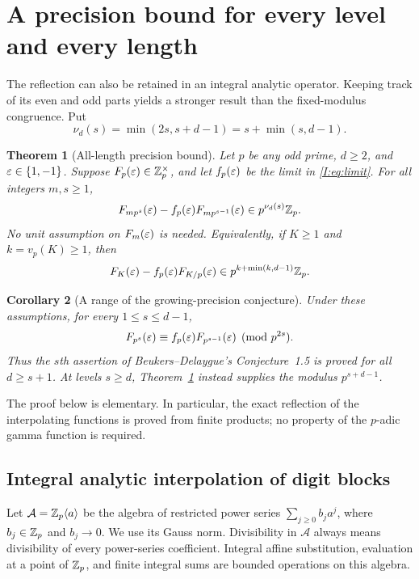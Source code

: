 \documentclass[11pt,letterpaper]{article}
\newtheorem{theorem}{Theorem}[section]
\newtheorem{corollary}[theorem]{Corollary}
\theoremstyle{definition}
\theoremstyle{remark}
\begin{document}
\section{A precision bound for every level and every length}
\label{I:sec:transfer}

The reflection can also be retained in an integral analytic operator.
Keeping track of its even and odd parts yields a stronger result than
the fixed-modulus congruence.
Put
\[
 \nu_d(s)=\min(2s,s+d-1)=s+\min(s,d-1).
\]

\begin{theorem}[All-length precision bound]\label{I:thm:alllength}
Let $p$ be any odd prime, $d\ge2$, and $\varepsilon\in\{1,-1\}$.
Suppose $F_p(\varepsilon)\in\mathbb Z_p^\times$, and let $f_p(\varepsilon)$ be the limit
in \eqref{I:eq:limit}.  For all integers $m,s\ge1$,
\begin{equation}\label{I:eq:alllength}
 F_{mp^s}(\varepsilon)-f_p(\varepsilon)F_{mp^{s-1}}(\varepsilon)
                  \in p^{\nu_d(s)}\mathbb Z_p.
\end{equation}
No unit assumption on $F_m(\varepsilon)$ is needed.
Equivalently, if $K\ge1$ and $k=v_p(K)\ge1$, then
\begin{equation}\label{I:eq:cutoffvaluation}
 F_K(\varepsilon)-f_p(\varepsilon)F_{K/p}(\varepsilon)
                  \in p^{k+\min(k,d-1)}\mathbb Z_p.
\end{equation}
\end{theorem}

\begin{corollary}[A range of the growing-precision conjecture]
\label{I:cor:bd15range}
Under these assumptions, for every $1\le s\le d-1$,
\[
 F_{p^s}(\varepsilon)\equiv f_p(\varepsilon)F_{p^{s-1}}(\varepsilon)
                                     \pmod{p^{2s}}.
\]
Thus the $s$th assertion of Beukers--Delaygue's Conjecture~1.5 is
proved for all $d\ge s+1$.  At levels $s\ge d$,
Theorem~\ref{I:thm:alllength} instead supplies the modulus $p^{s+d-1}$.
\end{corollary}

The proof below is elementary.  In particular, the exact reflection of
the interpolating functions is proved from finite products; no property
of the $p$-adic gamma function is required.

\subsection{Integral analytic interpolation of digit blocks}

Let $\mathcal A=\mathbb Z_p\langle a\rangle$ be the algebra of restricted power
series $\sum_{j\ge0}b_ja^j$, where $b_j\in\mathbb Z_p$ and $b_j\to0$.
We use its Gauss norm.  Divisibility in $\mathcal A$ always means
divisibility of every power-series coefficient.  Integral affine
substitution, evaluation at a point of $\mathbb Z_p$, and finite integral sums
are bounded operations on this algebra.
\end{document}
